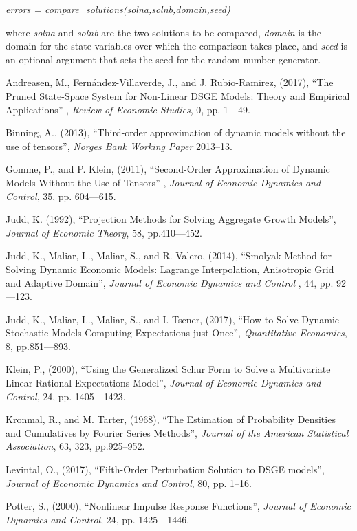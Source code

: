 \documentclass[notitlepage,11pt]{article}
\begin{document}
\bigskip

\textit{errors = compare\_solutions(solna,solnb,domain,seed)}

\bigskip

where \textit{solna} and \textit{solnb} are the two solutions to be
compared, \textit{domain} is the domain for the state variables over which
the comparison takes place, and \textit{seed} is an optional argument that
sets the seed for the random number generator.

\begin{thebibliography}{99}
\bibitem{} Andreasen, M., Fern\'{a}ndez-Villaverde, J., and J.
Rubio-Ramirez, (2017), \textquotedblleft The Pruned State-Space System for
Non-Linear DSGE Models: Theory and Empirical Applications\textquotedblright
, \textit{Review of Economic Studies}, 0, pp. 1---49.

\bibitem{} Binning, A., (2013), \textquotedblleft Third-order approximation
of dynamic models without the use of tensors\textquotedblright , \textit{%
Norges Bank Working Paper} 2013--13.

\bibitem{} Gomme, P., and P. Klein, (2011), \textquotedblleft Second-Order
Approximation of Dynamic Models Without the Use of Tensors\textquotedblright
, \textit{Journal of Economic Dynamics and Control}, 35, pp. 604---615.

\bibitem{} Judd, K. (1992), \textquotedblleft Projection Methods for Solving
Aggregate Growth Models\textquotedblright , \textit{Journal of Economic
Theory}, 58, pp.410---452.

\bibitem{} Judd, K., Maliar, L., Maliar, S., and R. Valero, (2014),
\textquotedblleft Smolyak Method for Solving Dynamic Economic Models:
Lagrange Interpolation, Anisotropic Grid and Adaptive
Domain\textquotedblright , \textit{Journal of Economic Dynamics and Control}%
, 44, pp. 92---123.

\bibitem{} Judd, K., Maliar, L., Maliar, S., and I. Tsener, (2017),
\textquotedblleft How to Solve Dynamic Stochastic Models Computing
Expectations just Once\textquotedblright , \textit{Quantitative Economics},
8, pp.851---893.

\bibitem{} Klein, P., (2000), \textquotedblleft Using the Generalized Schur
Form to Solve a Multivariate Linear Rational Expectations
Model\textquotedblright , \textit{Journal of Economic Dynamics and Control},
24, pp. 1405---1423.

\bibitem{} Kronmal, R., and M. Tarter, (1968), \textquotedblleft The
Estimation of Probability Densities and Cumulatives by Fourier Series
Methods\textquotedblright , \textit{Journal of the American Statistical
Association}, 63, 323, pp.925--952.

\bibitem{} Levintal, O., (2017), \textquotedblleft Fifth-Order Perturbation
Solution to DSGE models\textquotedblright , \textit{Journal of Economic
Dynamics and Control}, 80, pp. 1--16.

\bibitem{} Potter, S., (2000), \textquotedblleft Nonlinear Impulse Response
Functions\textquotedblright , \textit{Journal of Economic Dynamics and
Control}, 24, pp. 1425---1446.
\end{thebibliography}
\end{document}

